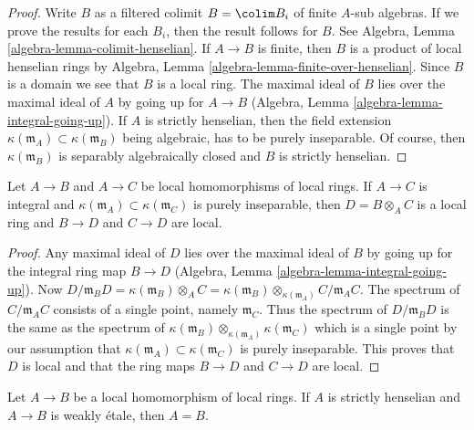 \begin{proof}
Write $B$ as a filtered colimit $B = \colim B_i$ of finite $A$-sub algebras.
If we prove the results for each $B_i$, then the result follows for $B$.
See Algebra, Lemma \ref{algebra-lemma-colimit-henselian}.
If $A \to B$ is finite, then $B$ is a product of local henselian rings by
Algebra, Lemma \ref{algebra-lemma-finite-over-henselian}.
Since $B$ is a domain we see that $B$ is a local ring.
The maximal ideal of $B$ lies over the maximal ideal of $A$ by
going up for $A \to B$ (Algebra, Lemma \ref{algebra-lemma-integral-going-up}).
If $A$ is strictly henselian, then the field extension
$\kappa(\mathfrak m_A) \subset \kappa(\mathfrak m_B)$
being algebraic, has to be purely inseparable.
Of course, then $\kappa(\mathfrak m_B)$ is separably algebraically
closed and $B$ is strictly henselian.
\end{proof}

\begin{lemma}
\label{lemma-local-tensor-with-integral}
Let $A \to B$ and $A \to C$ be local homomorphisms of local rings.
If $A \to C$ is integral and
$\kappa(\mathfrak m_A) \subset \kappa(\mathfrak m_C)$ is purely
inseparable, then $D = B \otimes_A C$ is a local ring and
$B \to D$ and $C \to D$ are local.
\end{lemma}

\begin{proof}
Any maximal ideal of $D$ lies over the maximal ideal of $B$ by
going up for the integral ring map
$B \to D$ (Algebra, Lemma \ref{algebra-lemma-integral-going-up}).
Now $D/\mathfrak m_B D = \kappa(\mathfrak m_B) \otimes_A C =
\kappa(\mathfrak m_B) \otimes_{\kappa(\mathfrak m_A)} C/\mathfrak m_A C$.
The spectrum of $C/\mathfrak m_A C$ consists of a
single point, namely $\mathfrak m_C$. Thus the spectrum of
$D/\mathfrak m_B D$ is the same as the spectrum of
$\kappa(\mathfrak m_B) \otimes_{\kappa(\mathfrak m_A)} \kappa(\mathfrak m_C)$
which is a single point by our assumption that
$\kappa(\mathfrak m_A) \subset \kappa(\mathfrak m_C)$ is purely
inseparable. This proves that $D$ is local and that the ring maps
$B \to D$ and $C \to D$ are local.
\end{proof}

\begin{theorem}[Olivier]
\label{theorem-olivier}
Let $A \to B$ be a local homomorphism of local rings.
If $A$ is strictly henselian and $A \to B$ is weakly \'etale, then
$A = B$.
\end{theorem}

